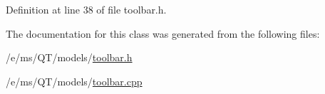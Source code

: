 Definition at line 38 of file toolbar.h.



The documentation for this class was generated from the following files:\begin{DoxyCompactItemize}
\item 
/e/ms/QT/models/\hyperlink{toolbar_8h}{toolbar.h}\item 
/e/ms/QT/models/\hyperlink{toolbar_8cpp}{toolbar.cpp}\end{DoxyCompactItemize}
